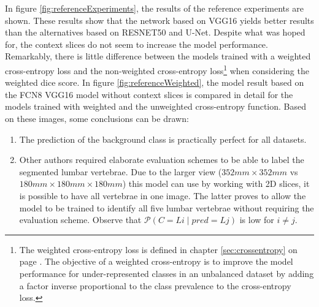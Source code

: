 \par{
    In figure \ref{fig:referenceExperiments}, the results of the reference experiments are shown.
    These results show that the network based on VGG16 yields better results than the alternatives based on RESNET50 and U-Net.
    Despite what was hoped for, the context slices do not seem to increase the model performance.
    Remarkably, there is little difference between the models trained with a weighted cross-entropy loss and the non-weighted cross-entropy loss\footnote{
        The weighted cross-entropy loss is defined in chapter \ref{sec:crossentropy} on page \pageref{sec:crossentropy}. 
        The objective of a weighted cross-entropy is to improve the model performance for under-represented classes in an unbalanced dataset by adding a factor inverse proportional to the class prevalence to the cross-entropy loss.
    } when considering the weighted dice score.
    In figure \ref{fig:referenceWeighted}, the model result based on the FCN8 VGG16 model without context slices is compared in detail for the models trained with weighted and the unweighted cross-entropy function.
    Based on these images, some conclusions can be drawn:
    \begin{enumerate}
        \item The prediction of the background class is practically perfect for all datasets.
        \item Other authors \cite{Lessmann2018,Chuang2019} required elaborate evaluation schemes to be able to label the segmented lumbar vertebrae. 
        Due to the larger view ($352 mm \times 352 mm$ vs $180 mm \times 180 mm \times 180 mm$) this model can use by working with 2D slices, it is possible to have all vertebrae in one image.
        The latter proves to allow the model to be trained to identify all five lumbar vertebrae without requiring the evaluation scheme.
        Observe that $\mathcal{P}(C = Li \mid pred = Lj)$ is low for $i\neq j$.
    \end{enumerate}
}
